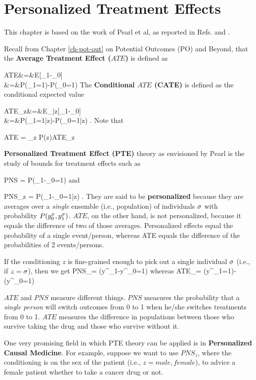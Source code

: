 \chapter{Personalized Treatment Effects}
\label{ch-personalized}


This chapter
is based on the work of Pearl et al, as reported in
Refs.
\cite{pearl-tian-2000} and
\cite{personalized-pearl-2021}.

Recall from Chapter \ref{ch-pot-out}
on Potential Outcomes (PO)
and Beyond, that
the {\bf Average Treatment Effect ($ATE$)}
is defined as

\beqa
ATE&=&E[\rvy_1-\rvy_0]
\\
&=&P(\rvy_1=1)-P(\rvy_0=1)
\eeqa
The {\bf Conditional $ATE$ (CATE) }
is defined as
the conditional expected value

\beqa
ATE_z&=&E_{|z}[\rvy_1-\rvy_0]
\\
&=&P(\rvy_1=1|z)-P(\rvy_0=1|z)
\;.
\eeqa
Note that

\beq ATE = \sum_z  P(z)ATE_z
\eeq

{\bf
Personalized Treatment Effect (PTE)}
theory
as envisioned by Pearl
is the study
of
bounds
for 
 treatment
effects such as

\beq
PNS = P(\rvy_1-\rvy_0=1)
\eeq
and

\beq
PNS_z = P(\rvy_1-\rvy_0=1|z)
\;.
\eeq
They are said to be {\bf personalized}
because they are averages
over a {\it single}
ensemble (i.e., population)
of individuals $\sigma$ with probability
 $P(y^\sigma_0, y^\sigma_1)$.
$ATE$, on the other hand, is not
personalized, because it equals the
difference of two of those averages.
Personalized effects equal the probability of a
single event/person, whereas ATE equals the difference of the probabilities of
2 events/persons.


If the conditioning $z$
is fine-grained enough
to pick out a single individual
$\sigma$ (i.e., if $z=\sigma$), then
we get
\beq
PNS_\s = \indi(y^\s_1-y^\s_0=1)
\;
\eeq
whereas
\beq
ATE_\s = \indi(y^\s_1=1)-\indi(y^\s_0=1)
\eeq

$ATE$ and $PNS$ measure different things.   $PNS$
measures the probability
that a {\it single person} will switch outcomes from 0 to 1 when he/she
switches treatments from 0 to 1. $ATE$
 measures the difference in
populations between
 those who survive taking the drug and those who
 survive without it.


One
very promising
field in
which PTE theory
can be applied
is in {\bf Personalized Causal Medicine}.
For example, suppose we want to
 use $PNS_z$,
where the conditioning is on the
sex of the patient (i.e., $z=male, female$),
to advice a female  patient
whether to take a cancer drug or not.

